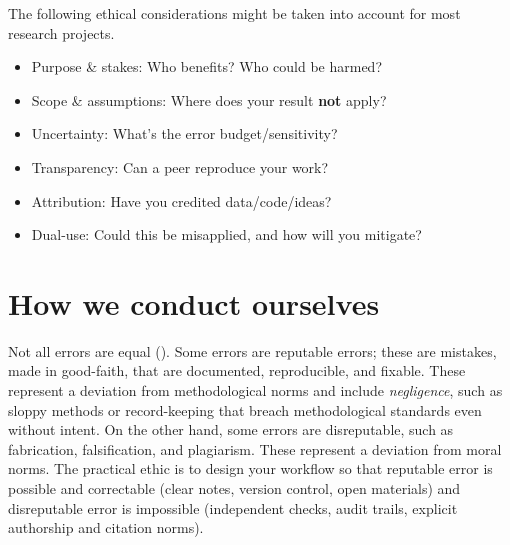 \documentclass[
  a4paper,
  DIV=11,
  numbers=noendperiod,
  oneside]{scrreprt}
\providecommand{\tightlist}{%
  \setlength{\itemsep}{0pt}\setlength{\parskip}{0pt}}
\begin{document}
\begin{tcolorbox}[enhanced jigsaw, colframe=quarto-callout-tip-color-frame, title=\textcolor{quarto-callout-tip-color}{\faLightbulb}\hspace{0.5em}{A quick ethics checklist}, breakable, opacityback=0, titlerule=0mm, colbacktitle=quarto-callout-tip-color!10!white, toptitle=1mm, colback=white, coltitle=black, toprule=.15mm, bottomtitle=1mm, left=2mm, arc=.35mm, rightrule=.15mm, bottomrule=.15mm, opacitybacktitle=0.6, leftrule=.75mm]

The following ethical considerations might be taken into account for
most research projects.

\begin{itemize}
\tightlist
\item
  Purpose \& stakes: Who benefits? Who could be harmed?\\
\item
  Scope \& assumptions: Where does your result \textbf{not} apply?\\
\item
  Uncertainty: What's the error budget/sensitivity?\\
\item
  Transparency: Can a peer reproduce your work?\\
\item
  Attribution: Have you credited data/code/ideas?\\
\item
  Dual-use: Could this be misapplied, and how will you mitigate?
\end{itemize}

\end{tcolorbox}

\section{How we conduct ourselves}\label{how-we-conduct-ourselves}

Not all errors are equal ().
Some errors are reputable errors; these are mistakes, made in
good-faith, that are documented, reproducible, and fixable. These
represent a deviation from methodological norms and include
\emph{negligence}, such as sloppy methods or record-keeping that breach
methodological standards even without intent. On the other hand, some
errors are disreputable, such as fabrication, falsification, and
plagiarism. These represent a deviation from moral norms. The practical
ethic is to design your workflow so that reputable error is possible and
correctable (clear notes, version control, open materials) and
disreputable error is impossible (independent checks, audit trails,
explicit authorship and citation norms).
\end{document}
